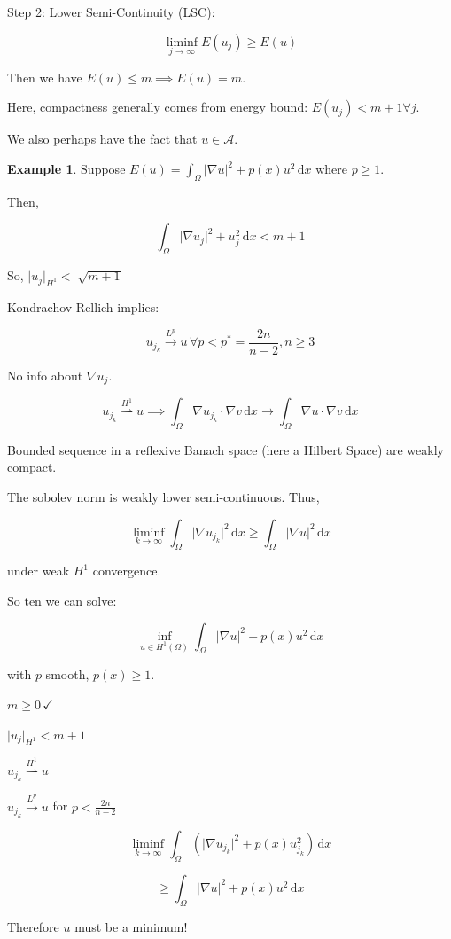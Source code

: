\documentclass{article}
\theoremstyle{definition}
\newtheorem{example}{Example}
\begin{document}
Step 2: Lower Semi-Continuity (LSC):

\[
    \liminf_{j \to \infty} E(u_j) \geq E(u)
\]

Then we have \(E(u) \leq m \implies E(u) = m\).

Here, compactness generally comes from energy bound: \(E(u_j) < m+1 \forall j\).

We also perhaps have the fact that \(u \in \mathcal{A}\).

\begin{example}
    Suppose \(E(u) = \int_{\Omega} \vert \nabla u \vert ^2 + p(x)u^2\,\mathrm{d}x\) where \(p \geq 1\).
    
    Then,

    \[
        \int_{\Omega} \vert \nabla u_j \vert ^2+ u_j^2 \,\mathrm{d}x < m+1
    \]

    So, \(\vert u_j \vert_{H^1} < \sqrt[]{m+1} \)
    
    Kondrachov-Rellich implies:

    \[
        u_{j_k} \overset{L^p}{\to} u \, \forall p < p^{\ast} = \frac{2n}{n-2}, n \geq 3
    \]

    No info about \(\nabla u_j\).

    \[
        u_{j_k} \overset{H^1}{\rightharpoonup} u \implies \int_{\Omega} \nabla u_{j_k} \cdot \nabla v \,\mathrm{d}x \to \int_{\Omega} \nabla u \cdot \nabla v \,\mathrm{d}x 
    \]


    Bounded sequence in a reflexive Banach space (here a Hilbert Space) are weakly compact.

    The sobolev norm is weakly lower semi-continuous. Thus,

    \[
        \liminf_{k \to \infty} \int_{\Omega} \vert \nabla u_{j_k} \vert ^ 2 \,\mathrm{d}x \geq \int_{\Omega} \vert \nabla u \vert ^ 2 \,\mathrm{d}x 
    \]

    under weak \(H^1\) convergence.

    So ten we can solve:

    \[
        \inf_{u\in H^1(\Omega)} \int_{\Omega} \vert \nabla u \vert ^ 2 + p(x)u^2 \,\mathrm{d}x 
    \]

    with \(p\) smooth, \(p(x) \geq 1\).

    \(m \geq 0 \, \checkmark\)

    \(\vert u_j \vert_{H^1} < m+1\) 

    \(u_{j_k} \overset{H^1}{\rightharpoonup} u\) 

    \(u_{j_k} \overset{L^p}{\to} u\) for \(p < \frac{2n}{n-2}\) 

    \[
        \liminf_{k \to \infty} \int_{\Omega} \left( \vert \nabla u_{j_k}  \vert ^2 + p(x) u_{j_k} ^2 \right)  \,\mathrm{d}x 
    \]

    \[
        \geq \int_{\Omega} \vert \nabla u \vert ^2 + p(x) u^2 \,\mathrm{d}x 
    \]

    Therefore \(u\) must be a minimum!

\end{example}
\end{document}
